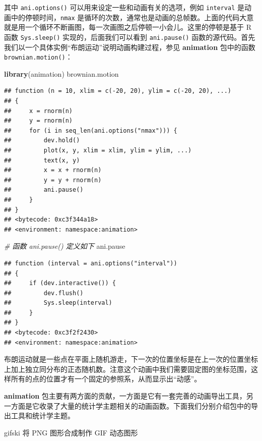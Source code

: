 \documentclass[
  b5paper,
  UTF8,twoside]{book}
\newenvironment{Shaded}{\begin{snugshade}}{\end{snugshade}}
\newcommand{\CommentTok}[1]{\textcolor[rgb]{0.56,0.35,0.01}{\textit{#1}}}
\newcommand{\FunctionTok}[1]{\textcolor[rgb]{0.13,0.29,0.53}{\textbf{#1}}}
\newcommand{\NormalTok}[1]{#1}
\begin{document}
其中 \texttt{ani.options()} 可以用来设定一些和动画有关的选项，例如 \texttt{interval} 是动画中的停顿时间，\texttt{nmax} 是循环的次数，通常也是动画的总帧数。上面的代码大意就是用一个循环不断画图，每一次画图之后停顿一小会儿。这里的停顿是基于 R 函数 \texttt{Sys.sleep()} 实现的，后面我们可以看到 \texttt{ani.pause()} 函数的源代码。首先我们以一个具体实例``布朗运动''说明动画构建过程，参见 \textbf{animation} 包中的函数 \texttt{brownian.motion()}：

\begin{Shaded}
\begin{Highlighting}[]
\FunctionTok{library}\NormalTok{(animation)}
\NormalTok{brownian.motion}
\end{Highlighting}
\end{Shaded}

\begin{verbatim}
## function (n = 10, xlim = c(-20, 20), ylim = c(-20, 20), ...) 
## {
##     x = rnorm(n)
##     y = rnorm(n)
##     for (i in seq_len(ani.options("nmax"))) {
##         dev.hold()
##         plot(x, y, xlim = xlim, ylim = ylim, ...)
##         text(x, y)
##         x = x + rnorm(n)
##         y = y + rnorm(n)
##         ani.pause()
##     }
## }
## <bytecode: 0xc3f344a18>
## <environment: namespace:animation>
\end{verbatim}

\begin{Shaded}
\begin{Highlighting}[]
\CommentTok{\# 函数 ani.pause() 定义如下}
\NormalTok{ani.pause}
\end{Highlighting}
\end{Shaded}

\begin{verbatim}
## function (interval = ani.options("interval")) 
## {
##     if (dev.interactive()) {
##         dev.flush()
##         Sys.sleep(interval)
##     }
## }
## <bytecode: 0xc3f2f2430>
## <environment: namespace:animation>
\end{verbatim}

布朗运动就是一些点在平面上随机游走，下一次的位置坐标是在上一次的位置坐标上加上独立同分布的正态随机数。注意这个动画中我们需要固定图的坐标范围，这样所有的点的位置才有一个固定的参照系，从而显示出``动感''。

\textbf{animation} 包主要有两方面的贡献，一方面是它有一套完善的动画导出工具，另一方面是它收录了大量的统计学主题相关的动画函数。下面我们分别介绍包中的导出工具和统计学主题。

gifski 将 PNG 图形合成制作 GIF 动态图形
\end{document}
